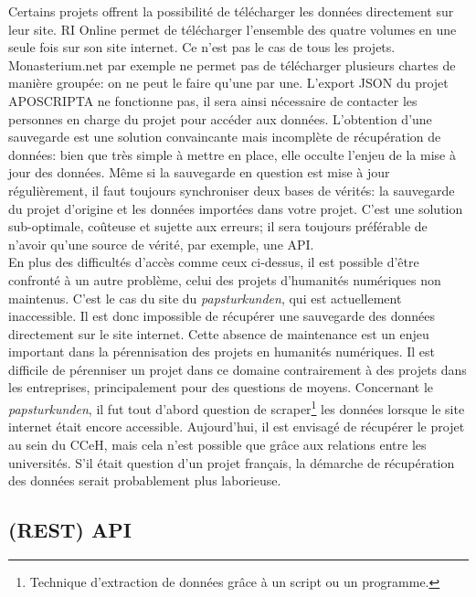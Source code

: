 Certains projets offrent la possibilité de télécharger les données directement sur leur site. RI Online permet de télécharger l’ensemble des quatre volumes en une seule fois sur son site internet. Ce n’est pas le cas de tous les projets. Monasterium.net par exemple ne permet pas de télécharger plusieurs chartes de manière groupée: on ne peut le faire qu’une par une. L’export JSON du projet APOSCRIPTA ne fonctionne pas, il sera ainsi nécessaire de contacter les personnes en charge du projet pour accéder aux données.
L’obtention d’une sauvegarde est une solution convaincante mais incomplète de récupération de données: bien que très simple à mettre en place, elle occulte l’enjeu de la mise à jour des données.  Même si la sauvegarde en question est mise à jour régulièrement, il faut toujours synchroniser deux bases de vérités: la sauvegarde du projet d’origine et les données importées dans votre projet. C’est une solution sub-optimale, coûteuse et sujette aux erreurs; il sera toujours préférable de n’avoir qu’une source de vérité, par exemple, une API.\\

En plus des difficultés d’accès comme ceux ci-dessus, il est possible d’être confronté à un autre problème, celui des projets d’humanités numériques non maintenus. C’est le cas du site du \textit{papsturkunden}, qui est actuellement inaccessible. Il est donc impossible de récupérer une sauvegarde des données directement sur le site internet. Cette absence de maintenance est un enjeu important dans la pérennisation des projets en humanités numériques. Il est difficile de pérenniser un projet dans ce domaine contrairement à des projets dans les entreprises, principalement pour des questions de moyens. Concernant le \textit{papsturkunden}, il fut tout d’abord question de scraper\footnote{Technique d’extraction de données grâce à un script ou un programme.} les données lorsque le site internet était encore accessible. Aujourd’hui, il est envisagé de récupérer le projet au sein du CCeH, mais cela n’est possible que grâce aux relations entre les universités. S’il était question d’un projet français, la démarche de récupération des données serait probablement plus laborieuse.

    
    \subsection{(REST) API}

